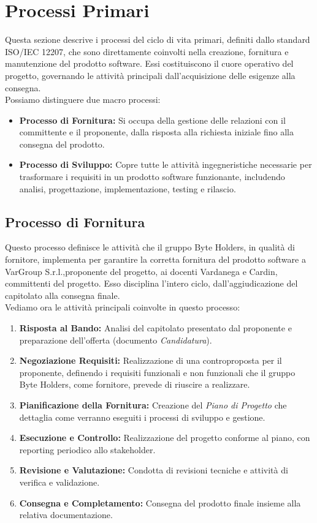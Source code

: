 \documentclass[a4paper, 11pt]{article}
\begin{document}
\section{Processi Primari}
Questa sezione descrive i processi del ciclo di vita primari, definiti dallo standard ISO/IEC 12207, che sono direttamente coinvolti nella creazione, fornitura e manutenzione del prodotto software. 
Essi costituiscono il cuore operativo del progetto, governando le attività principali dall'acquisizione delle esigenze alla consegna.
\\
Possiamo distinguere due macro processi:
\begin{itemize}
    \item \textbf{Processo di Fornitura:} Si occupa della gestione delle relazioni con il committente e il proponente, dalla risposta alla richiesta iniziale fino alla consegna del prodotto.
    \item \textbf{Processo di Sviluppo:} Copre tutte le attività ingegneristiche necessarie per trasformare i requisiti in un prodotto software funzionante, includendo analisi, progettazione, implementazione, testing e rilascio.
\end{itemize}

\subsection{Processo di Fornitura}
Questo processo definisce le attività che il gruppo Byte Holders, in qualità di fornitore, implementa per garantire la corretta fornitura del prodotto software a VarGroup S.r.l.,proponente del progetto, ai docenti Vardanega e Cardin, committenti del progetto. 
Esso disciplina l'intero ciclo, dall'aggiudicazione del capitolato alla consegna finale.
\\
Vediamo ora le attività principali coinvolte in questo processo:
\begin{enumerate}
    \item \textbf{Risposta al Bando:} Analisi del capitolato presentato dal proponente e preparazione dell'offerta (documento \textit{Candidatura}).
    \item \textbf{Negoziazione Requisiti:} Realizzazione di una controproposta per il proponente, definendo i requisiti funzionali e non funzionali che il gruppo Byte Holders, come fornitore, prevede di riuscire a realizzare.
    \item \textbf{Pianificazione della Fornitura:} Creazione del \textit{Piano di Progetto} che dettaglia come verranno eseguiti i processi di sviluppo e gestione.
    \item \textbf{Esecuzione e Controllo:} Realizzazione del progetto conforme al piano, con reporting periodico allo stakeholder.
    \item \textbf{Revisione e Valutazione:} Condotta di revisioni tecniche e attività di verifica e validazione.
    \item \textbf{Consegna e Completamento:} Consegna del prodotto finale insieme alla relativa documentazione.
\end{enumerate}
\end{document}
